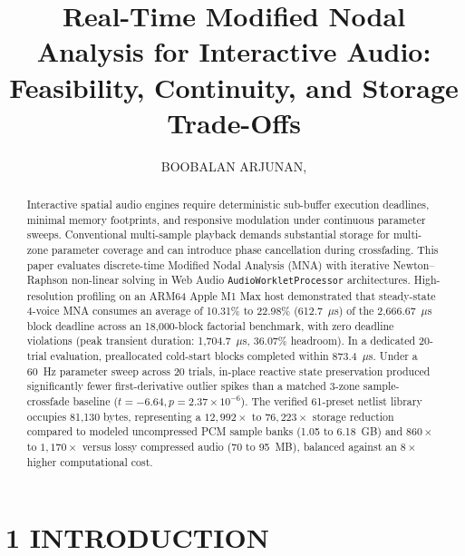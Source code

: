 \documentclass[fleqn,draft]{jaes}
\begin{document}
\title{Real-Time Modified Nodal Analysis for Interactive Audio: Feasibility, Continuity, and Storage Trade-Offs}


\author[1]{BOOBALAN ARJUNAN, \AESmember}

\maketitle

\begin{abstract}
Interactive spatial audio engines require deterministic sub-buffer execution deadlines, minimal memory footprints, and responsive modulation under continuous parameter sweeps. Conventional multi-sample playback demands substantial storage for multi-zone parameter coverage and can introduce phase cancellation during crossfading. This paper evaluates discrete-time Modified Nodal Analysis (MNA) with iterative Newton--Raphson non-linear solving in Web Audio \texttt{AudioWorkletProcessor} architectures. High-resolution profiling on an ARM64 Apple M1 Max host demonstrated that steady-state 4-voice MNA consumes an average of 10.31\% to 22.98\% (612.7~$\mu$s) of the 2,666.67~$\mu$s block deadline across an 18,000-block factorial benchmark, with zero deadline violations (peak transient duration: 1,704.7~$\mu$s, 36.07\% headroom). In a dedicated 20-trial evaluation, preallocated cold-start blocks completed within 873.4~$\mu$s. Under a 60~Hz parameter sweep across 20 trials, in-place reactive state preservation produced significantly fewer first-derivative outlier spikes than a matched 3-zone sample-crossfade baseline ($t = -6.64, p = 2.37 \times 10^{-6}$). The verified 61-preset netlist library occupies 81,130 bytes, representing a $12,992\times$ to $76,223\times$ storage reduction compared to modeled uncompressed PCM sample banks (1.05 to 6.18~GB) and $860\times$ to $1,170\times$ versus lossy compressed audio (70 to 95~MB), balanced against an $8\times$ higher computational cost.
\end{abstract}


\section{1 INTRODUCTION}
\end{document}
